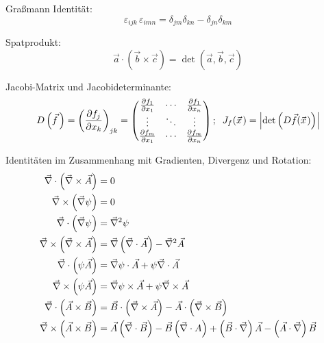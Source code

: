 \documentclass[11pt]{article}
\numberwithin{equation}{section}
\begin{document}
				\noindent
				Graßmann Identität:
				\begin{equation}
					\varepsilon_{ijk}\,\varepsilon_{imn}=\delta_{jm}\delta_{kn}-\delta_{jn}\delta_{km}
				\end{equation}

				\noindent
				Spatprodukt:
				\begin{equation}
					\vec{a}\cdot\left(\vec{b}\times\vec{c}\right) = \det\left(\vec{a},\vec{b},\vec{c}\right)
				\end{equation}

				\noindent
				Jacobi-Matrix und Jacobideterminante:
				\begin{equation}
					D\left(\vec{f}\,\right) = \left(\frac{\partial f_j}{\partial x_k}\right)_{jk}
					= \left(\begin{matrix}
					\frac{\partial f_1}{\partial x_1} & \dotsb & \frac{\partial f_1}{\partial x_n} \\
					\vdots & \ddots & \vdots \\
					\frac{\partial f_m}{\partial x_1} & \dotsb & \frac{\partial f_m}{\partial x_n} \\
					\end{matrix}\right);\;\;J_f(\pvec{x})=\left|\det\left(D\vec{f}(\pvec{x})\right)\right|
				\end{equation}

				\noindent
				Identitäten im Zusammenhang mit Gradienten, Divergenz und Rotation:
				\begin{equation}
					\begin{aligned}
						\vec{\nabla}\cdot\left(\vec{\nabla}\times\vec{A}\right) &= 0 \\
						\vec{\nabla}\times\left(\vec{\nabla}\psi\right) &= 0 \\
						\vec{\nabla}\cdot\left(\vec{\nabla}\psi\right) &= \vec{\nabla}^2\psi \\
						\vec{\nabla}\times\left(\vec{\nabla}\times\vec{A}\right) &= \vec{\nabla}\left(\vec{\nabla}\cdot\vec{A}\right) -\vec{\nabla}^2\vec{A} \\
						\vec{\nabla}\cdot\left(\psi\vec{A}\right) &= \vec{\nabla}\psi\cdot\vec{A} + \psi\vec{\nabla}\cdot\vec{A}\\
						\vec{\nabla}\times\left(\psi\vec{A}\right) &= \vec{\nabla}\psi\times\vec{A} + \psi\vec{\nabla}\times\vec{A} \\
						\vec{\nabla}\cdot\left(\vec{A}\times\vec{B}\right) &= \vec{B}\cdot\left(\vec{\nabla}\times\vec{A}\right) - 	\vec{A}\cdot\left(\vec{\nabla}\times\vec{B}\right) \\
						\vec{\nabla}\times\left(\vec{A}\times\vec{B}\right) &= \vec{A}\left(\vec{\nabla}\cdot\vec{B}\right) - \vec{B}\left(\vec{\nabla}\cdot{A}\right) + \left(\vec{B}\cdot\vec{\nabla}\right)\vec{A} - \left(\vec{A}\cdot\vec{\nabla}\right)\vec{B} \\
					\end{aligned}
				\end{equation}
\end{document}
